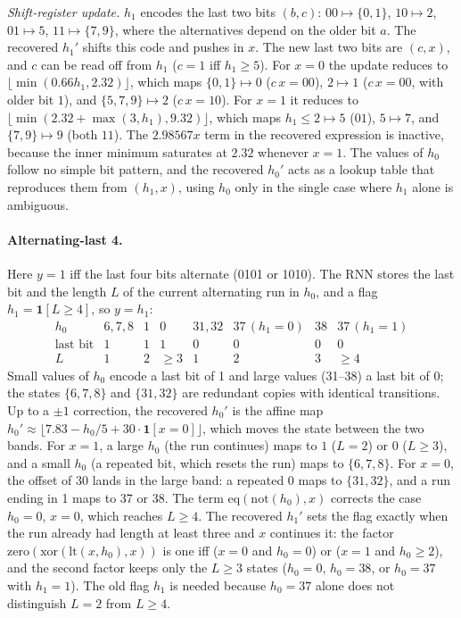 \documentclass[10pt]{article}
\newcommand{\op}[1]{\mathrm{#1}}
\begin{document}
\emph{Shift-register update.} $h_1$ encodes the last two bits $(b,c)$:
$00\mapsto\{0,1\}$, $10\mapsto2$, $01\mapsto5$, $11\mapsto\{7,9\}$, where the alternatives depend on
the older bit $a$. The recovered $h_1'$ shifts this code and pushes in $x$. The new last two bits
are $(c,x)$, and $c$ can be read off from $h_1$ ($c=1$ iff $h_1\ge5$). For $x=0$ the update reduces
to $\lfloor\min(0.66h_1,2.32)\rfloor$, which maps $\{0,1\}\mapsto0$ ($c\,x=00$), $2\mapsto1$ ($c\,x=00$, with
older bit $1$), and $\{5,7,9\}\mapsto2$ ($c\,x=10$). For $x=1$ it reduces to
$\lfloor\min(2.32+\max(3,h_1),9.32)\rfloor$, which maps $h_1\le2\mapsto5$ ($01$), $5\mapsto7$, and
$\{7,9\}\mapsto9$ (both $11$). The $2.98567x$ term in the recovered expression is inactive, because
the inner minimum saturates at $2.32$ whenever $x=1$. The values of $h_0$ follow no
simple bit pattern, and the recovered $h_0'$ acts as a lookup table that reproduces them from
$(h_1,x)$, using $h_0$ only in the single case where $h_1$ alone is ambiguous.

\paragraph{Alternating-last 4.}
Here $y=1$ iff the last four bits alternate (0101 or 1010). The RNN stores the last bit and
the length $L$ of the current alternating run in $h_0$, and a flag $h_1=\mathbf 1[L\ge4]$, so
$y=h_1$:
\[
\begin{array}{c|ccc|cccc}
h_0 & 6,7,8 & 1 & 0 & 31,32 & 37\,(h_1{=}0) & 38 & 37\,(h_1{=}1)\\\hline
\text{last bit} & 1&1&1 & 0&0&0&0\\
L & 1 & 2 & \ge3 & 1 & 2 & 3 & \ge4
\end{array}
\]
Small values of $h_0$ encode a last bit of 1 and large values (31--38) a last bit of 0; the
states $\{6,7,8\}$ and $\{31,32\}$ are redundant copies with identical transitions.
Up to a $\pm1$ correction, the recovered $h_0'$ is the affine map
$h_0'\approx\lfloor7.83-h_0/5+30\cdot\mathbf 1[x{=}0]\rfloor$, which moves the state between the
two bands. For $x=1$, a large $h_0$ (the run continues) maps to $1$ ($L=2$) or $0$ ($L\ge3$),
and a small $h_0$ (a repeated bit, which resets the run) maps to $\{6,7,8\}$. For $x=0$, the
offset of 30 lands in the large band: a repeated 0 maps to $\{31,32\}$, and a run ending in 1
maps to 37 or 38. The term $\op{eq}(\op{not}(h_0),x)$ corrects the case $h_0=0$, $x=0$, which
reaches $L\ge4$. The recovered $h_1'$ sets the flag exactly when the run already had length
at least three and $x$ continues it: the factor $\op{zero}(\op{xor}(\op{lt}(x,h_0),x))$ is one
iff ($x=0$ and $h_0=0$) or ($x=1$ and $h_0\ge2$), and the second factor keeps only the
$L\ge3$ states ($h_0=0$, $h_0=38$, or $h_0=37$ with $h_1=1$). The old flag $h_1$ is needed
because $h_0=37$ alone does not distinguish $L=2$ from $L\ge4$.
\end{document}
